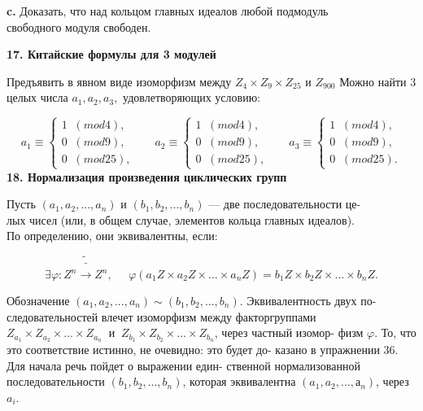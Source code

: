 \documentclass{../template/mai_book}
\begin{document}
\medskip

{\bf c.} Доказать, что над кольцом главных идеалов любой подмодуль \\
свободного модуля свободен. 

\medskip

{\noindent\bf 17. Китайские формулы для 3 модулей}

\medskip

Предъявить в явном виде изоморфизм между $ Z_4 \times Z_9 \times Z_25$ и $Z_{900}$ 
Можно найти 3 целых числа $a_1,a_2,a_3,$ удовлетворяющих условию: 

$$a_1 \equiv 
\begin{cases}
1\;\;(mod 4),  \\
0\;\;(mod 9),  \\
0\;\;(mod 25),  
\end{cases}
\;\;\;\;\;\;
a_2 \equiv 
\begin{cases}
1\;\;(mod 4),  \\
0\;\;(mod 9),  \\
0\;\;(mod 25),  
\end{cases}
\;\;\;\;\;\;
a_3 \equiv 
\begin{cases}
1\;\;(mod 4),  \\
0\;\;(mod 9),  \\
0\;\;(mod 25).  
\end{cases}
$$
\pagebreak
{\noindent\bf 18. Нормализация произведения циклических групп}

\medskip

Пусть $(a_1, a_2,..., a_n)$ и $(b_1, b_2,..., b_n)$ — две последовательности 
це-\\лых чисел (или, в общем случае, элементов кольца главных идеалов).\\ 
По определению, они эквивалентны, если:

$$\exists \varphi:Z^n\tilde{\bar{\rightarrow}} Z^n,\;\;\;\;\;\varphi(a_1Z\times a_2Z\times...\times a_nZ)=b_1Z\times b_2Z\times...\times b_nZ.$$

\noindent Обозначение $(a_1, a_2,..., a_n) \sim(b_1, b_2,..., b_n)$. Эквивалентность двух
по-\linebreak
следовательностей влечет изоморфизм между факторгруппами 
$ Z_{a_1}\times Z_{a_2}\times ...\times Z_{a_n}\;\;\text{и}\;\;Z_{b_1}\times Z_{b_2}\times ...\times Z_{b_n} $, через частный 
изомор-\linebreak
физм $\varphi$. То, что это соответствие истинно, не очевидно: это будет 
до-\linebreak
казано в упражнении 36. Для начала речь пойдет о выражении 
един-\linebreak
ственной нормализованной последовательности $(b_1, b_2,..., b_n)$, которая\linebreak
эквивалентна $(a_1, a_2,..., а_n)$, через $a_i$. 
\end{document}
